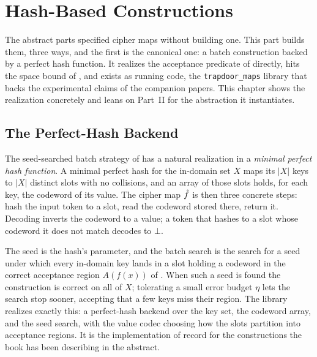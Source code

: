 
\chapter{Hash-Based Constructions}
\label{ch:hash-constructions}

The abstract parts specified cipher maps without building one. This part
builds them, three ways, and the first is the canonical one: a batch
construction backed by a perfect hash function. It realizes the acceptance
predicate of  directly, hits the space bound of
, and exists as running code, the
\texttt{trapdoor\_maps} library that backs the experimental claims of the
companion papers. This chapter shows the realization concretely and leans on
Part~II for the abstraction it instantiates.

\section{The Perfect-Hash Backend}
\label{sec:phf-backend}

The seed-searched batch strategy of  has a natural
realization in a \emph{minimal perfect hash function}. A minimal perfect
hash for the in-domain set $X$ maps its $\lvert X\rvert$ keys to
$\lvert X\rvert$ distinct slots with no collisions, and an array of those
slots holds, for each key, the codeword of its value. The cipher map $\hat{f}$
is then three concrete steps: hash the input token to a slot, read the
codeword stored there, return it. Decoding inverts the codeword to a value;
a token that hashes to a slot whose codeword it does not match decodes to
$\bot$.

The seed is the hash's parameter, and the batch search is the search for a
seed under which every in-domain key lands in a slot holding a codeword in
the correct acceptance region $A(f(x))$ of . When such a
seed is found the construction is correct on all of $X$; tolerating a small
error budget $\eta$ lets the search stop sooner, accepting that a few keys
miss their region. The library realizes exactly this: a perfect-hash backend
over the key set, the codeword array, and the seed search, with the value
codec choosing how the slots partition into acceptance regions. It is the
implementation of record for the constructions the book has been describing
in the abstract.

